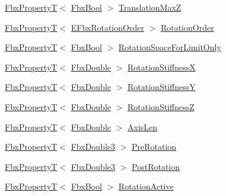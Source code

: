 \begin{Indent}
\begin{DoxyCompactItemize}
\item 
\hyperlink{class_fbx_property_t}{Fbx\+PropertyT}$<$ \hyperlink{fbxtypes_8h_a92e0562b2fe33e76a242f498b362262e}{Fbx\+Bool} $>$ \hyperlink{class_fbx_node_a82452c5c84518939525f69ebbf1cd190}{Translation\+MaxZ}
\item 
\hyperlink{class_fbx_property_t}{Fbx\+PropertyT}$<$ \hyperlink{fbxmath_8h_ae46778666b56bb0abe5992b855fe9332}{E\+Fbx\+Rotation\+Order} $>$ \hyperlink{class_fbx_node_ac985c192cf9439c2618de0de4ef46ab1}{Rotation\+Order}
\item 
\hyperlink{class_fbx_property_t}{Fbx\+PropertyT}$<$ \hyperlink{fbxtypes_8h_a92e0562b2fe33e76a242f498b362262e}{Fbx\+Bool} $>$ \hyperlink{class_fbx_node_a7fe7f807388b6d974c612bbf432604e4}{Rotation\+Space\+For\+Limit\+Only}
\item 
\hyperlink{class_fbx_property_t}{Fbx\+PropertyT}$<$ \hyperlink{fbxtypes_8h_a171e72a1c46fc15c1a6c9c31948c1c5b}{Fbx\+Double} $>$ \hyperlink{class_fbx_node_afb4e18a55373bff597d3827026e049d1}{Rotation\+StiffnessX}
\item 
\hyperlink{class_fbx_property_t}{Fbx\+PropertyT}$<$ \hyperlink{fbxtypes_8h_a171e72a1c46fc15c1a6c9c31948c1c5b}{Fbx\+Double} $>$ \hyperlink{class_fbx_node_a95e74933f4fcdbf6da893462ade3181f}{Rotation\+StiffnessY}
\item 
\hyperlink{class_fbx_property_t}{Fbx\+PropertyT}$<$ \hyperlink{fbxtypes_8h_a171e72a1c46fc15c1a6c9c31948c1c5b}{Fbx\+Double} $>$ \hyperlink{class_fbx_node_a9465fe60724712661ce0f0cd3cb26235}{Rotation\+StiffnessZ}
\item 
\hyperlink{class_fbx_property_t}{Fbx\+PropertyT}$<$ \hyperlink{fbxtypes_8h_a171e72a1c46fc15c1a6c9c31948c1c5b}{Fbx\+Double} $>$ \hyperlink{class_fbx_node_a8b54074cd906df334d5d6d0cc9756223}{Axis\+Len}
\item 
\hyperlink{class_fbx_property_t}{Fbx\+PropertyT}$<$ \hyperlink{fbxtypes_8h_ae0a96f14cde566774c7553aa7523b7a7}{Fbx\+Double3} $>$ \hyperlink{class_fbx_node_a0e0b6a0097fd99a0f3b6808e741ef23d}{Pre\+Rotation}
\item 
\hyperlink{class_fbx_property_t}{Fbx\+PropertyT}$<$ \hyperlink{fbxtypes_8h_ae0a96f14cde566774c7553aa7523b7a7}{Fbx\+Double3} $>$ \hyperlink{class_fbx_node_a79bbc002a7cdb919db11525831a6a469}{Post\+Rotation}
\item 
\hyperlink{class_fbx_property_t}{Fbx\+PropertyT}$<$ \hyperlink{fbxtypes_8h_a92e0562b2fe33e76a242f498b362262e}{Fbx\+Bool} $>$ \hyperlink{class_fbx_node_aaa4a7a57dc28f7979c04c096bd94b752}{Rotation\+Active}
\item 

\end{DoxyCompactItemize}
\end{Indent}
